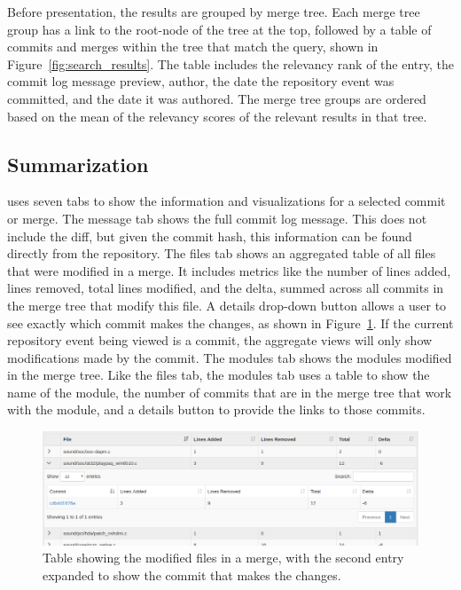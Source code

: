 Before presentation, the results are grouped by merge tree. Each
merge tree group has a link to the root-node of the tree at the top,
followed by a table of commits and merges within the tree that match the
query, shown in Figure~\ref{fig:search_results}. The table includes the
relevancy rank of the entry, the commit log message preview, author, the
date the repository event was committed, and the date it was authored.
The merge tree groups are ordered based on the mean of the relevancy
scores of the relevant results in that tree.

\subsection{Summarization}
\label{sub:summarization}

\tool uses seven tabs to show the information and visualizations for a
selected commit or merge. The message tab shows the full commit log
message. This does not include the diff, but given the commit hash, this
information can be found directly from the repository. The files tab
shows an aggregated table of all files that were modified in a merge. It
includes metrics like the number of lines added, lines removed, total
lines modified, and the delta, summed across all commits in the merge
tree that modify this file. A details drop-down button allows a user to
see exactly which commit makes the changes, as shown in
Figure~\ref{fig:linvis_files}. If the current repository event being
viewed is a commit, the aggregate views will only show modifications
made by the commit. The modules tab shows the modules modified in the
merge tree. Like the files tab, the modules tab uses a table to show the
name of the module, the number of commits that are in the merge tree
that work with the module, and a details button to provide the links to
those commits.

\begin{figure}[htpb]
  \centering
  \includegraphics[width=\linewidth]{figures/linvis/linvis_files.png}
  \caption{Table showing the modified files in a merge, with the second
  entry expanded to show the commit that makes the changes.}
  \label{fig:linvis_files}
\end{figure}

